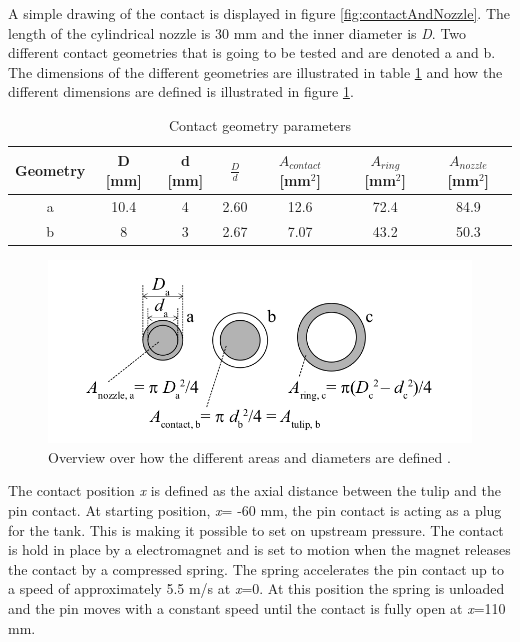\documentclass[10pt,a4paper]{article} %
\begin{document}
A simple drawing of the contact is displayed in figure \ref{fig:contactAndNozzle}. The length of the cylindrical nozzle is 30 mm and the inner diameter is \textit{D}. Two different contact geometries that is going to be tested and are denoted a and b. The dimensions of the different geometries are illustrated in table \ref{tab:contGeoPara} and how the different dimensions are defined is illustrated in figure \ref{fig:AreacontactAndNozzle}.

\begin{table}[H]
\center
\caption{Contact geometry parameters}
 \begin{tabular}{|c|c|c|c|c|c|c|}
\hline 
Geometry & D [mm] & d [mm] & $\frac{D}{d}$ & $A_{contact}$ [mm$^2$] & $A_{ring}$ [mm$^2$] & $A_{nozzle}$ [mm$^2$] \\ 
\hline 
a & 10.4 & 4 & 2.60 & 12.6 & 72.4 & 84.9 \\ 
\hline 
b & 8 & 3 & 2.67 & 7.07 & 43.2 & 50.3 \\ 
\hline 
\end{tabular} 
\label{tab:contGeoPara}
\end{table}

\begin{figure} [h]
\centering
\includegraphics[scale=0.3]{Bilder/Method/areaSetUp.png}
\caption{Overview over how the different areas and diameters are defined \cite{bib:AFIMVLBA}.} \label{fig:AreacontactAndNozzle}
\end{figure}

The contact position \textit{x} is defined as the axial distance between the tulip and the pin contact. At starting position, \textit{x}= -60 mm, the pin contact is acting as a plug for the tank. This is making it possible to set on upstream pressure. The contact is hold in place by a electromagnet and is set to motion when the magnet releases the contact by a compressed spring. The spring accelerates the pin contact up to a speed of approximately 5.5 m/s at \textit{x}=0. At this position the spring is unloaded  and the pin moves with a constant speed until the contact is fully open at \textit{x}=110 mm.
\end{document}
